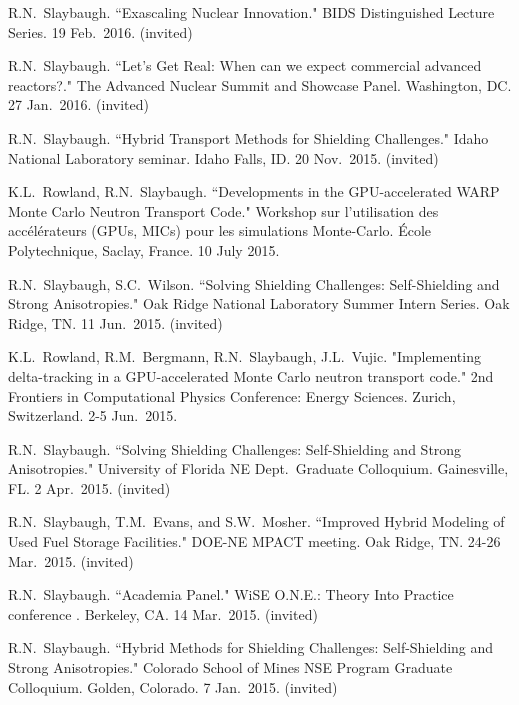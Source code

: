 \begin{bibsection}
\item R.N.\ Slaybaugh. ``Exascaling Nuclear Innovation." BIDS Distinguished Lecture Series. 19 Feb.\ 2016. (invited) 

\item R.N.\ Slaybaugh. ``Let’s Get Real: When can we expect commercial
advanced reactors?." The Advanced Nuclear Summit and Showcase Panel. Washington, DC. 27 Jan.\ 2016. (invited)

\item R.N.\ Slaybaugh. ``Hybrid Transport Methods for Shielding Challenges." Idaho National Laboratory seminar. Idaho Falls, ID. 20 Nov.\ 2015. (invited) 

\item K.L.\ Rowland, R.N.\ Slaybaugh. ``Developments in the GPU-accelerated WARP Monte Carlo Neutron Transport Code." Workshop sur l'utilisation des acc\'{e}l\'{e}rateurs (GPUs, MICs) pour les simulations Monte-Carlo. \'{E}cole Polytechnique, Saclay, France. 10 July 2015. 

\item R.N.\ Slaybaugh, S.C.\ Wilson. ``Solving Shielding Challenges: Self-Shielding and Strong Anisotropies." Oak Ridge National Laboratory Summer Intern Series. Oak Ridge, TN. 11 Jun.\ 2015. (invited)

\item K.L.\ Rowland, R.M.\ Bergmann, R.N.\ Slaybaugh, J.L.\ Vujic. "Implementing delta-tracking in a GPU-accelerated Monte Carlo neutron transport code." 2nd Frontiers in Computational Physics Conference: Energy Sciences. Zurich, Switzerland. 2-5 Jun.\ 2015.  

\item R.N.\ Slaybaugh. ``Solving Shielding Challenges: Self-Shielding and Strong Anisotropies." University of Florida NE Dept.\ Graduate Colloquium. Gainesville, FL. 2 Apr.\ 2015. (invited)

\item R.N.\ Slaybaugh, T.M.\ Evans, and S.W.\ Mosher. ``Improved Hybrid Modeling of Used Fuel Storage Facilities." DOE-NE MPACT meeting. Oak Ridge, TN. 24-26 Mar.\ 2015. (invited)

\item R.N.\ Slaybaugh. ``Academia Panel." WiSE O.N.E.: Theory Into Practice conference . Berkeley, CA. 14 Mar.\ 2015. (invited)

\item R.N.\ Slaybaugh. ``Hybrid Methods for Shielding Challenges: Self-Shielding and Strong Anisotropies." Colorado School of Mines NSE Program Graduate Colloquium. Golden, Colorado. 7 Jan.\ 2015. (invited)


\end{bibsection}
